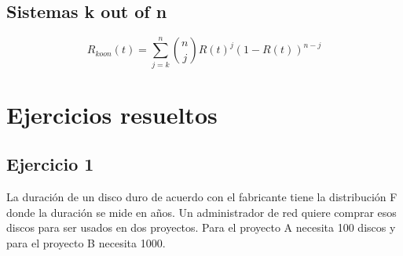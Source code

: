 \subsection{Sistemas k out of n}
\[R_{koon}(t)= \sum_{j=k}^{n}\binom{n}{j}R(t)^j(1-R(t))^{n-j}\]
\newpage%
\section{Ejercicios resueltos}
\subsection{Ejercicio 1}
La duración de un disco duro de acuerdo con el fabricante tiene la distribución F donde la duración se mide en años. Un administrador de red quiere comprar esos discos para ser usados en dos proyectos. Para el proyecto A necesita 100 discos y para el proyecto B necesita 1000.

